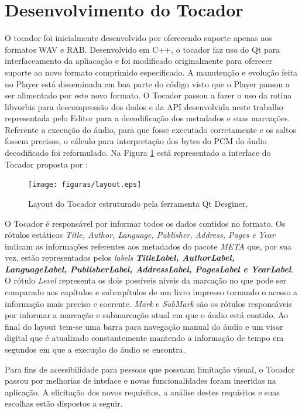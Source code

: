 \section{Desenvolvimento do Tocador}

O tocador foi inicialmente desenvolvido por \cite{herbert} oferecendo suporte apenas aos formatos WAV e RAB. Desenvolvido em C++, o tocador faz uso do Qt para interfaceamento da apliacação e foi modificado originalmente para oferecer suporte ao novo formato comprimido especificado. A manutenção e evolução feita no Player está disseminada em boa parte do código visto que o Player passou a ser alimentado por este novo formato. O Tocador passou a fazer o uso da rotina libvorbis para descompressão dos dados e da API desenvolvida neste trabalho representada pelo Editor para a decodificação dos metadados e suas marcações. Referente a execução do áudio, para que fosse executado corretamente e os saltos fossem precisos, o cálculo para interpretação dos bytes do PCM do áudio decodificado foi reformulado. Na Figura \ref{layout} está representado a interface do Tocador proposta por \cite{herbert}:

\begin{figure}[ht]
	\centering
		\texttt{[image: figuras/layout.eps]}
	\caption{Layout do Tocador estruturado pela ferramenta Qt Desginer.}
	\label{layout}
\end{figure}

O Tocador é responsável por informar todos os dados contidos no formato. Os rótulos estáticos \textit{Title, Author, Language, Publisher, Address, Pages e Year} indicam as informações referentes aos metadados do pacote \textit{META} que, por sua vez, estão representados pelos \textit{labels} \textit{\textbf{TitleLabel, AuthorLabel, LanguageLabel, PublisherLabel, AddressLabel, PagesLabel e YearLabel}}. O rótulo \textit{Level} representa os dois possíveis níveis da marcação no que pode ser comparado aos capítulos e subcapítulos de um livro impresso tornando o acesso a informação mais preciso e coerente. \textit{Mark} e \textit{SubMark} são os rótulos responsáveis por informar a marcação e submarcação atual em que o áudio está contido. Ao final do layout tem-se uma barra para navegação manual do áudio e um visor digital que é atualizado constantemente mantendo a informação de tempo em segundos em que a execução do áudio se encontra.

Para fins de acessibilidade para pessoas que possuam limitação visual, o Tocador passou por melhorias de inteface e novas funcionalidades foram inseridas na aplicação. A elicitação dos novos requisitos, a análise destes requisitos e suas escolhas estão dispostos a seguir.

